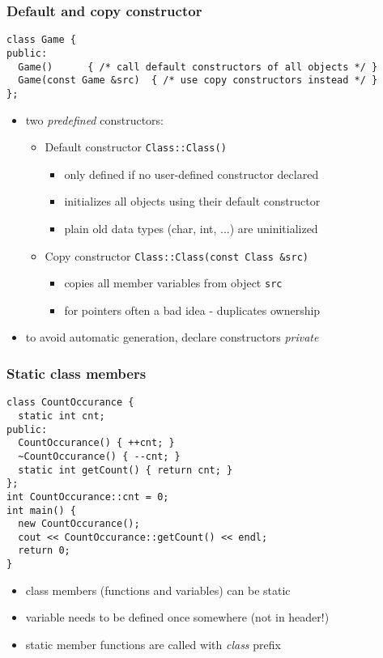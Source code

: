\documentclass{slides}
\begin{document}
\begin{frame}[fragile]
  \frametitle{Default and copy constructor}

\begin{lstlisting}
class Game {
public:
  Game()      { /* call default constructors of all objects */ }
  Game(const Game &src)  { /* use copy constructors instead */ }
};
\end{lstlisting}

  \begin{itemize}
  \item two \emph{predefined} constructors:
    \begin{itemize}
    \item Default constructor \lstinline!Class::Class()!
      \begin{itemize}
      \item only defined if no user-defined constructor declared
      \item initializes all objects using their default constructor
      \item plain old data types (char, int, ...) are uninitialized
      \end{itemize}
    \item Copy constructor \lstinline!Class::Class(const Class &src)!
      \begin{itemize}
      \item copies all member variables from object \lstinline!src!
      \item for pointers often a bad idea - duplicates ownership
      \end{itemize}
    \end{itemize}
  \item to avoid automatic generation, declare constructors
    \emph{private}
  \end{itemize}
\end{frame}

\begin{frame}[fragile]
  \frametitle{Static class members}

\begin{lstlisting}[emph={static,getCount}]
class CountOccurance {
  static int cnt;
public:
  CountOccurance() { ++cnt; }
  ~CountOccurance() { --cnt; }
  static int getCount() { return cnt; }
};
int CountOccurance::cnt = 0;
int main() {
  new CountOccurance();
  cout << CountOccurance::getCount() << endl;
  return 0;
}
\end{lstlisting}

  \begin{itemize}
  \item class members (functions and variables) can be static
  \item variable needs to be defined once somewhere (not in header!)
  \item static member functions are called with \emph{class} prefix
  \end{itemize}

\end{frame}
\end{document}
